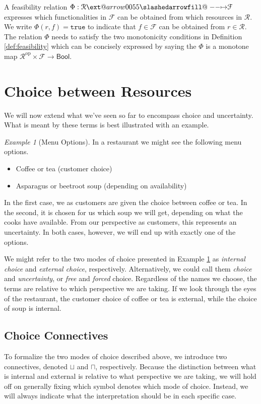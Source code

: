 \documentclass[12pt]{article}
\makeatletter
\theoremstyle{definition}
\theoremstyle{plain}
\theoremstyle{plain}
\theoremstyle{plain}
\theoremstyle{plain}
\theoremstyle{remark}
\newtheorem{example}{Example}[section]
\theoremstyle{remark}
\newcommand{\mc}[1]{\mathcal{#1}}
\def\slashedarrowfill@#1#2#3#4#5{%
	$\m@th\thickmuskip0mu\medmuskip\thickmuskip\thinmuskip\thickmuskip
	\relax#5#1\mkern-7mu%
	\cleaders\hbox{$#5\mkern-2mu#2\mkern-2mu$}\hfill
	\mathclap{#3}\mathclap{#2}%
	\cleaders\hbox{$#5\mkern-2mu#2\mkern-2mu$}\hfill
	\mkern-7mu#4$%
}
\def\rightslashedarrowfill@{%
	\slashedarrowfill@\relbar\relbar\mapstochar\rightarrow}
\newcommand\xslashedrightarrow[2][]{%
	\ext@arrow 0055{\rightslashedarrowfill@}{#1}{#2}}
\makeatother
\begin{document}
\begin{tcolorbox}[title=Feasibility Relations, colframe=Apricot, colback = paleorange, coltitle = Sepia]
	A feasibility relation $\Phi: \mc{R} \xslashedrightarrow{} \mc{F}$ expresses which functionalities in $\mc{F}$ can be obtained from which resources in $\mc{R}$. We write $\Phi(r,f) = \mathtt{true}$ to indicate that $f \in \mc{F}$ can be obtained from $r \in \mc{R}$. The relation $\Phi$ needs to satisfy the two monotonicity conditions in Definition \ref{def:feasibility} which can be concisely expressed by saying the $\Phi$ is a monotone map $\mc{R}^\text{op} \times \mc{F} \rightarrow \mathsf{Bool}$.
\end{tcolorbox}

\section{Choice between Resources}
We will now extend what we've seen so far to encompass choice and uncertainty. What is meant by these terms is best illustrated with an example.

\begin{example}[Menu Options]\label{ex:menu}
	In a restaurant we might see the following menu options.
	\begin{itemize}
		\item Coffee or tea (customer choice)
		\item Asparagus or beetroot soup (depending on availability)
	\end{itemize}
	In the first case, we as customers are given the choice between coffee or tea. In the second, it is chosen for us which soup we will get, depending on what the cooks have available. From our perspective as customers, this represents an uncertainty. In both cases, however, we will end up with exactly one of the options.
\end{example}

We might refer to the two modes of choice presented in Example \ref{ex:menu} as \emph{internal choice} and \emph{external choice}, respectively. Alternatively, we could call them \emph{choice} and \emph{uncertainty}, or \emph{free} and \emph{forced} choice. Regardless of the names we choose, the terms are relative to which perspective we are taking. If we look through the eyes of the restaurant, the customer choice of coffee or tea is external, while the choice of soup is internal.

\subsection{Choice Connectives}
To formalize the two modes of choice described above, we introduce two connectives, denoted  $\sqcup$ and $\sqcap$, respectively. Because the distinction between what is internal and external is relative to what perspective we are taking, we will hold off on generally fixing which symbol denotes which mode of choice. Instead, we will always indicate what the interpretation should be in each specific case. \\
\end{document}
